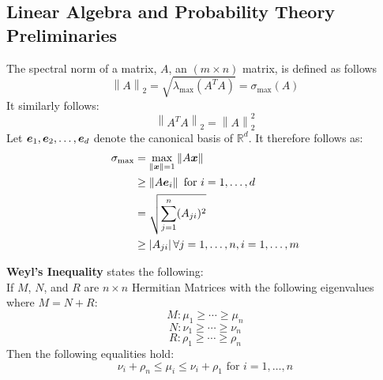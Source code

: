 \documentclass{article} %
\newcommand{\norm}[1]{\left\lVert#1\right\rVert}
\begin{document}
	\begin{appendices}
		
	\newpage
	\appendix
	\startcontents[sections]
	\newpage
	
	
	\section{Linear Algebra and Probability Theory Preliminaries}
	
	\begin{fact} The spectral norm of a matrix, $A$, an $(m \times n)$ matrix, is defined as follows
		\begin{equation}
			\norm{A}_2 = \sqrt{\lambda_{\max}\left(A^T A\right)} = \sigma_{\max}(A)
		\end{equation}
		It similarly follows:
		\begin{equation}
			\norm{A^T A}_2 = \norm{A}^2_2
		\end{equation}
		Let ${\bm{e}}_1, {\bm{e}}_2, \dots, {\bm{e}}_d$ denote the canonical basis of $\mathbb{R}^d$. It therefore follows as:
		\begin{align*}
			\sigma_{\max} &= \max_{\norm{\vx} = 1}\norm{A\vx}\\
			&\geq \norm{A\ve_i} \text{ for } i= 1,\dots,d \\
			&= \sqrt{\sum_{j=1}^n (A_{ji})^2} \\
			&\geq |A_{ji}| \,\forall j = 1,\dots,n, i=1,\dots,m
		\end{align*}
	\end{fact}

	\begin{fact}
		\textbf{Weyl's Inequality} states the following:\\ If $M$, $N$, and $R$ are $n \times n$ Hermitian Matrices with the following eigenvalues where $M = N + R$:
		\begin{equation*}
			M: \mu_1 \geq \cdots \geq \mu_n
		\end{equation*}
		\begin{equation*}
			N: \nu_1 \geq \cdots \geq \nu_n
		\end{equation*}
		\begin{equation*}
			R: \rho_1 \geq \cdots \geq \rho_n
		\end{equation*}
		Then the following equalities hold:
		\begin{equation*}
			\nu_i + \rho_n \leq \mu_i \leq \nu_i + \rho_1 \text { for } i = 1,\dots,n
		\end{equation*}
	\end{fact}


\end{appendices}
\end{document}
